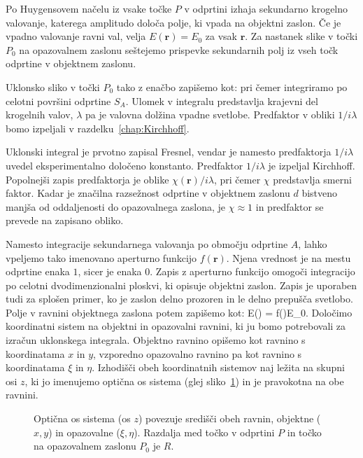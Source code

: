 Po Huygensovem načelu iz vsake točke $P$ v odprtini izhaja sekundarno krogelno valovanje, 
katerega amplitudo določa polje, ki vpada na objektni zaslon. Če je vpadno valovanje
ravni val, velja $E(\mathbf{r}) = E_0$ za vsak $\mathbf{r}$. Za nastanek slike
v točki $P_0$  na opazovalnem zaslonu seštejemo prispevke sekundarnih
polj iz vseh točk odprtine v objektnem zaslonu. 

Uklonsko sliko v točki $P_0$ tako z enačbo zapišemo kot:
pri čemer integriramo po celotni površini odprtine $S_A$. Ulomek v integralu predstavlja
krajevni del krogelnih valov, $\lambda$ pa je valovna dolžina vpadne svetlobe. Predfaktor
v obliki $1/i\lambda$ bomo izpeljali v razdelku~\ref{chap:Kirchhoff}.
\begin{remark}
Uklonski integral je prvotno zapisal Fresnel, vendar je namesto predfaktorja 
$1/i\lambda$ uvedel eksperimentalno določeno konstanto. Predfaktor $1/i\lambda$ je 
izpeljal Kirchhoff. Popolnejši zapis predfaktorja je oblike $ \chi(\mathbf{r})/i\lambda$,
pri čemer $\chi$ predstavlja smerni faktor. Kadar je značilna razsežnost odprtine v 
objektnem zaslonu $d$ bistveno manjša od oddaljenosti do opazovalnega zaslona, 
je $\chi \approx 1$ in predfaktor se prevede na zapisano obliko. 
\end{remark}

Namesto integracije sekundarnega valovanja po območju odprtine $A$, lahko vpeljemo
tako imenovano aperturno funkcijo $f(\mathbf{r})$. Njena vrednost je na mestu odprtine enaka $1$,
sicer je enaka $0$. Zapis z aperturno funkcijo omogoči integracijo po celotni dvodimenzionalni
ploskvi, ki opisuje objektni zaslon. Zapis je uporaben tudi za splošen primer, ko je zaslon
delno prozoren in le delno prepušča svetlobo. Polje v ravnini objektnega zaslona potem zapišemo kot:
\beq
E() = f()E_0.
\label{eq:05_02}
\eeq
Določimo koordinatni sistem na objektni in opazovalni ravnini, ki ju bomo potrebovali
za izračun uklonskega integrala. Objektno ravnino
opišemo kot ravnino s koordinatama $x$ in $y$, vzporedno opazovalno ravnino pa kot ravnino
s koordinatama $\xi$ in $\eta$. Izhodišči obeh koordinatnih sistemov naj ležita 
na skupni osi $z$, ki jo imenujemo optična os sistema (glej sliko~\ref{fig:05_koordinate})
in je pravokotna na obe ravnini.
\begin{figure}[ht]
\centering
\def\svgwidth{120truemm} 

\caption{Optična os sistema (os $z$) povezuje središči obeh ravnin, objektne ($x,y$) in 
opazovalne ($\xi, \eta$). Razdalja med točko v odprtini $P$ in točko na opazovalnem zaslonu $P_0$
je $R$.}
\label{fig:05_koordinate}
\end{figure}

